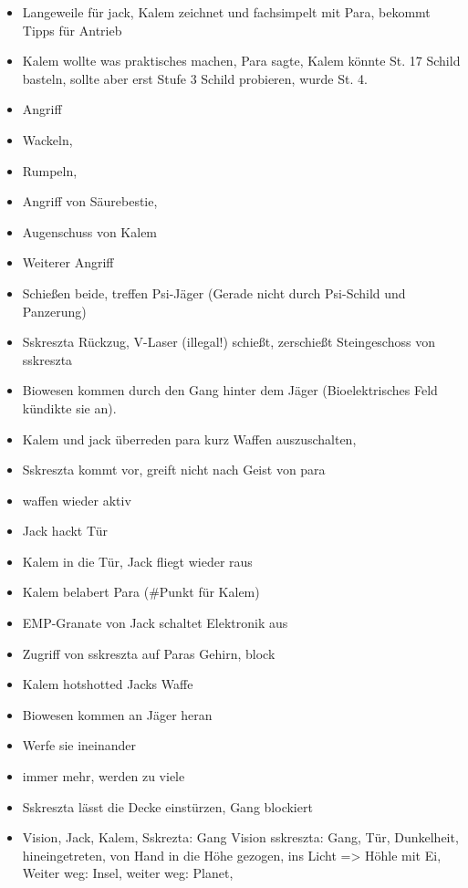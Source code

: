 \documentclass[11pt]{article}
\begin{document}
\begin{itemize}
  \begin{itemize}
  \item
    Langeweile für jack, Kalem zeichnet und fachsimpelt mit Para,
    bekommt Tipps für Antrieb
  \item
    Kalem wollte was praktisches machen, Para sagte, Kalem könnte St. 17
    Schild basteln, sollte aber erst Stufe 3 Schild probieren, wurde St.
    4.
  \item
    Angriff
  \item
    Wackeln,
  \item
    Rumpeln,
  \item
    Angriff von Säurebestie,
  \item
    Augenschuss von Kalem
  \item
    Weiterer Angriff
  \item
    Schießen beide, treffen Psi-Jäger (Gerade nicht durch Psi-Schild und
    Panzerung)
  \item
    Sskreszta Rückzug, V-Laser (illegal!) schießt, zerschießt
    Steingeschoss von sskreszta
  \item
    Biowesen kommen durch den Gang hinter dem Jäger (Bioelektrisches
    Feld kündikte sie an).
  \item
    Kalem und jack überreden para kurz Waffen auszuschalten,
  \item
    Sskreszta kommt vor, greift nicht nach Geist von para
  \item
    waffen wieder aktiv
  \item
    Jack hackt Tür
  \item
    Kalem in die Tür, Jack fliegt wieder raus
  \item
    Kalem belabert Para (\#Punkt für Kalem)
  \item
    EMP-Granate von Jack schaltet Elektronik aus
  \item
    Zugriff von sskreszta auf Paras Gehirn, block
  \item
    Kalem hotshotted Jacks Waffe
  \item
    Biowesen kommen an Jäger heran
  \item
    Werfe sie ineinander
  \item
    immer mehr, werden zu viele
  \item
    Sskreszta lässt die Decke einstürzen, Gang blockiert
  \item
    Vision, Jack, Kalem, Sskrezta: Gang Vision sskreszta: Gang, Tür,
    Dunkelheit, hineingetreten, von Hand in die Höhe gezogen, ins Licht
    =\textgreater{} Höhle mit Ei, Weiter weg: Insel, weiter weg: Planet,

\end{itemize}
\end{itemize}
\end{document}
